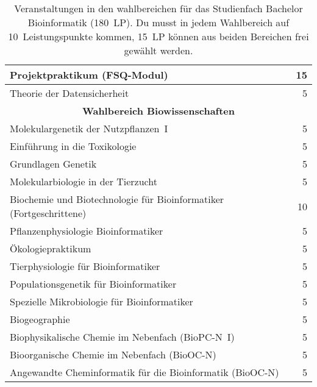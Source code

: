 \begin{table}[!th]
\begin{small}
\begin{tabularx}{\textwidth}{|X||r|}
			Projektpraktikum (FSQ-Modul)                                        &          15 \\ \hline
			Theorie der Datensicherheit                                         &           5 \\ \hline\hline
			\multicolumn{2}{|c|}{\textbf{Wahlbereich Biowissenschaften}}                       \\ \hline
			Molekulargenetik der Nutzpflanzen~I                                 &           5 \\ \hline
			Einführung in die Toxikologie                                       &           5 \\ \hline
			Grundlagen Genetik                                                  &           5 \\ \hline
			Molekularbiologie in der Tierzucht                                  &           5 \\ \hline
			Biochemie und Biotechnologie für Bioinformatiker (Fortgeschrittene) &          10 \\ \hline
			Pflanzenphysiologie Bioinformatiker                                 &           5 \\ \hline
			Ökologiepraktikum                                                   &           5 \\ \hline
			Tierphysiologie für Bioinformatiker                                 &           5 \\ \hline
			Populationsgenetik für Bioinformatiker                              &           5 \\ \hline
			Spezielle Mikrobiologie für Bioinformatiker                         &           5 \\ \hline
			Biogeographie                                                       &           5 \\ \hline
			Biophysikalische Chemie im Nebenfach (BioPC-N~I)                    &           5 \\ \hline
			Bioorganische Chemie im Nebenfach (BioOC-N)                         &           5 \\ \hline
			Angewandte Cheminformatik für die Bioinformatik (BioOC-N)          &           5 \\ \hline
		\end{tabularx}
	\end{small}
	\caption{Veranstaltungen in den wahlbereichen für das Studienfach Bachelor Bioinformatik (180~LP). Du musst in jedem Wahlbereich auf 10~Leistungspunkte kommen, 15~LP können aus beiden Bereichen frei gewählt werden.\label{plan-bioinfo2}}
\end{table}

